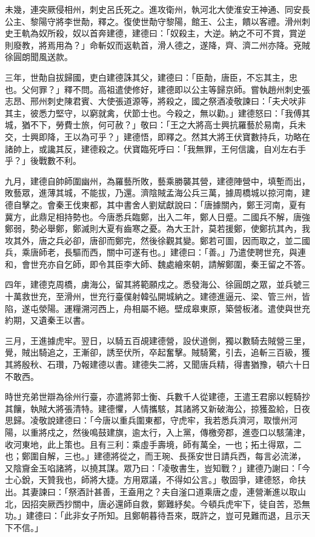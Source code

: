 \begin{pinyinscope}
 未幾，連突厥侵相州，刺史呂氏死之。進攻衛州，執河北大使淮安王神通、同安長公主、黎陽守將李世勣，釋之。復使世勣守黎陽，館王、公主，饋以客禮。滑州刺史王軌為奴所殺，奴以首奔建德，建德曰：「奴殺主，大逆。納之不可不賞，賞逆則廢教，將焉用為？」命斬奴而返軌首，滑人德之，遂降，齊、濟二州亦降。兗賊徐圓朗聞風送款。



 三年，世勣自拔歸國，吏白建德誅其父，建德曰：「臣勣，唐臣，不忘其主，忠也。父何罪？」釋不問。高祖遣使修好，建德即以公主等歸京師。嘗執趙州刺史張志昂、邢州刺史陳君賓、大使張道源等，將殺之，國之祭酒凌敬諫曰：「夫犬吠非其主，彼悉力堅守，以窮就禽，伏節士也。今殺之，無以勸。」建德怒曰：「我傅其城，猶不下，勞費士旅，何可赦？」敬曰：「王之大將高士興抗羅藝於易南，兵未交，士興即降，王以為可乎？」建德悟，即釋之。然其大將王伏寶數持兵，功略在諸帥上，或讒其反，建德殺之。伏寶臨死呼曰：「我無罪，王何信讒，自刈左右手乎？」後戰數不利。



 九月，建德自帥師圍幽州，為羅藝所敗，藝乘勝襲其營，建德陣營中，填塹而出，敗藝眾，進薄其城，不能拔，乃還。濟陰賊孟海公兵三萬，據周橋城以掠河南，建德自擊之。會秦王伐東都，其中書舍人劉斌獻說曰：「唐據關內，鄭王河南，夏有冀方，此鼎足相持勢也。今唐悉兵臨鄭，出入二年，鄭人日蹙。二國兵不解，唐強鄭弱，勢必舉鄭，鄭滅則大夏有齒寒之憂。為大王計，莫若援鄭，使鄭抗其內，我攻其外，唐之兵必卻，唐卻而鄭完，然後徐觀其變。鄭若可圖，因而取之，並二國兵，乘唐師老，長驅而西，關中可遂有也。」建德曰：「善。」乃遣使聘世充，與連和，會世充亦自乞師，即令其臣李大師、魏處繪來朝，請解鄭圍，秦王留之不答。



 四年，建德克周橋，虜海公，留其將範願戍之。悉發海公、徐圓朗之眾，並兵號三十萬救世充，至滑州，世充行臺僕射韓弘開城納之。建德進逼元、梁、管三州，皆陷，遂屯滎陽。運糧溯河西上，舟相屬不絕。壁成皋東原，築營板渚。遣使與世充約期，又遺秦王以書。



 三月，王進據虎牢。翌日，以騎五百覘建德營，設伏道側，獨以數騎去賊營三里，覺，賊出騎追之，王漸卻，誘至伏所，卒起奮擊。賊騎驚，引去，追斬三百級，獲其將殷秋、石瓚，乃報建德以書。建德失二將，又聞唐兵精，得書猶豫，頓六十日不敢西。



 時世充弟世辯為徐州行臺，亦遣將郭士衡、兵數千人從建德，王遣王君廓以輕騎抄其饟，執賊大將張清特。建德懼，人情攜駭，其諸將又新破海公，掠獲盈給，日夜思歸。凌敬說建德曰：「今唐以重兵圍東都，守虎牢，我若悉兵濟河，取懷州河陽，以重將戍之，然後鳴鼓建旗，逾太行，入上黨，傳檄旁郡，進壺口以駭蒲津，收河東地，此上策也。且有三利：乘虛手壽境，師有萬全，一也；拓土得眾，二也；鄭圍自解，三也。」建德將從之，而王琬、長孫安世日請兵西，每言必流涕，又陰齎金玉啗諸將，以撓其謀。眾乃曰：「凌敬書生，豈知戰？」建德乃謝曰：「今士心銳，天贊我也，師將大捷。方用眾議，不得如公言。」敬固爭，建德怒，命扶出。其妻諫曰：「祭酒計甚善，王盍用之？夫自滏口道乘唐之虛，連營漸進以取山北，因招突厥西抄關中，唐必還師自救，鄭難紓矣。今頓兵虎牢下，徒自苦，恐無功。」建德曰：「此非女子所知。且鄭朝暮待吾來，既許之，豈可見難而退，且示天下不信。」




\end{pinyinscope}
